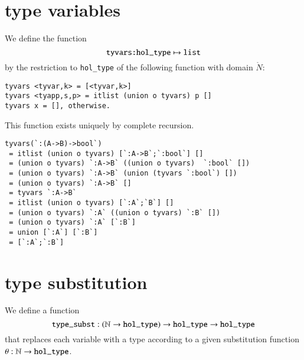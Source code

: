 \section{type variables}



\begin{definition} We define the function
$$
\verb!tyvars:hol_type!\mapsto \verb!list!
$$
by the restriction to \verb!hol_type! of the following function with domain $\ring{N}$:
\begin{verbatim}
tyvars <tyvar,k> = [<tyvar,k>]
tyvars <tyapp,s,p> = itlist (union o tyvars) p []
tyvars x = [], otherwise.
\end{verbatim}
This function exists uniquely by complete recursion.
\end{definition}

\begin{example}
\begin{verbatim}
tyvars(`:(A->B)->bool`) 
 = itlist (union o tyvars) [`:A->B`;`:bool`] []
 = (union o tyvars) `:A->B` ((union o tyvars)  `:bool` [])
 = (union o tyvars) `:A->B` (union (tyvars `:bool`) [])
 = (union o tyvars) `:A->B` []
 = tyvars `:A->B`
 = itlist (union o tyvars) [`:A`;`B`] []
 = (union o tyvars) `:A` ((union o tyvars) `:B` [])
 = (union o tyvars) `:A` [`:B`]
 = union [`:A`] [`:B`]
 = [`:A`;`:B`]
\end{verbatim}
\end{example}

\section{type substitution}

We define a function
$$
\verb!type_subst!:(\ring{N}\to \verb!hol_type!)\to \verb!hol_type! \to \verb!hol_type!
$$
that replaces each variable with a type according to a given substitution function $\theta:\ring{N}\to \verb!hol_type!$.


